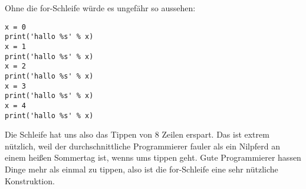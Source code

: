 Ohne die for-Schleife würde es ungefähr so aussehen:

\begin{Verbatim}[frame=single]
x = 0
print('hallo %s' % x)
x = 1
print('hallo %s' % x)
x = 2
print('hallo %s' % x)
x = 3
print('hallo %s' % x)
x = 4
print('hallo %s' % x)
\end{Verbatim}

Die Schleife hat uns also das Tippen von 8 Zeilen erspart. Das ist extrem nützlich, weil der durchschnittliche Programmierer fauler als ein Nilpferd an einem heißen Sommertag ist, wenns ums tippen geht. Gute Programmierer hassen Dinge mehr als einmal zu tippen, also ist die for-Schleife eine sehr nützliche Konstruktion.

